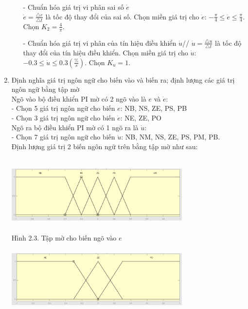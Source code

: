 \documentclass[a4paper, 12pt]{article}
\begin{document}
\begin{enumerate}
\begin{enumerate}
			\item[-] Chuẩn hóa giá trị vi phân sai số $\dot{e}$\\
			$\dot{e} = \frac{\triangle e}{\triangle t}$ là tốc độ thay đổi của sai số. Chọn miền giá trị cho $ \dot{e} $: $ -\frac{\pi}{4} \le \dot{e} \le \frac{\pi}{4} $. Chọn $K_{2} = \frac{4}{\pi}$.
			\item[-] Chuẩn hóa giá trị vi phân của tín hiệu điều khiển $\dot{u}$//
			$\dot{u} = \frac{\triangle u}{\triangle t}$ là tốc độ thay đổi của tín hiệu điều khiển. Chọn miền giá trị cho $\dot{u}$: $-0.3 \le \dot{u} \le 0.3 (\frac{\%}{s})$. Chọn $K_{u} = 1$.
		\end{enumerate}
		\item Định nghĩa giá trị ngôn ngữ cho biến vào và biến ra; định lượng các giá trị ngôn ngữ bằng tập mờ\\
		Ngõ vào bộ điều khiển PI mờ có 2 ngõ vào là $e$ và $\dot{e}$:\\
		- Chọn 5 giá trị ngôn ngữ cho biến $e$: NB, NS, ZE, PS, PB\\
		- Chọn 3 giá trị ngôn ngữ cho biến $\dot{e}$: NE, ZE, PO\\
		Ngõ ra bộ điều khiển PI mờ có 1 ngõ ra là $\dot{u}$:\\
		- Chọn 7 giá trị ngôn ngữ cho biến $\dot{u}$: NB, NM, NS, ZE, PS, PM, PB.\\
		Định lượng giá trị 2 biến ngôn ngữ trên bằng tập mờ như sau:\\\newpage
		\begin{center}
			\includegraphics[width=350px,height=150px]{images/efigure}\\
			Hình 2.3. Tập mờ cho biến ngõ vào $e$\\
			\vspace{0.5cm}
			\includegraphics[width=350px,height=150px]{images/edotfigure}\\

\end{center}
\end{enumerate}
\end{document}
